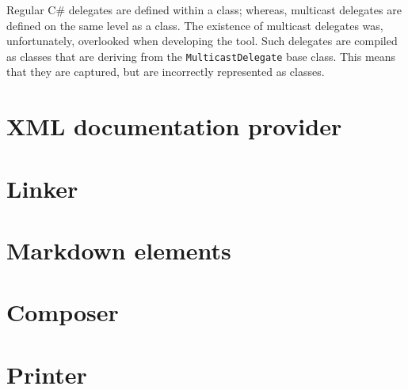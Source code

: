 Regular C\# delegates are defined within a class; whereas, multicast delegates are defined on the same level as a class.
The existence of multicast delegates was, unfortunately, overlooked when developing the tool.
Such delegates are compiled as classes that are deriving from the \lstinline[language=csh]{MulticastDelegate} base class.
This means that they are captured, but are incorrectly represented as classes.

\section{XML documentation provider}

\section{Linker}

\section{Markdown elements}

\section{Composer}

\section{Printer}